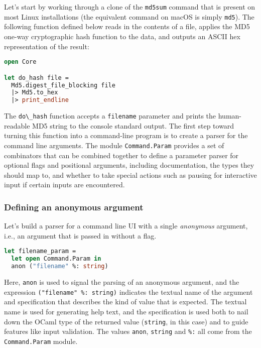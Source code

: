 Let's start by working through a clone of the
\passthrough{\lstinline!md5sum!} command that is present on most Linux
installations (the equivalent command on macOS is simply
\passthrough{\lstinline!md5!}). The following function defined below
reads in the contents of a file, applies the MD5 one-way cryptographic
hash function to the data, and outputs an ASCII hex representation of
the result: 

\begin{lstlisting}[language=Caml]
open Core

let do_hash file =
  Md5.digest_file_blocking file
  |> Md5.to_hex
  |> print_endline
\end{lstlisting}

The \passthrough{\lstinline!do\_hash!} function accepts a
\passthrough{\lstinline!filename!} parameter and prints the
human-readable MD5 string to the console standard output. The first step
toward turning this function into a command-line program is to create a
parser for the command line arguments. The module
\passthrough{\lstinline!Command.Param!} provides a set of combinators
that can be combined together to define a parameter parser for optional
flags and positional arguments, including documentation, the types they
should map to, and whether to take special actions such as pausing for
interactive input if certain inputs are encountered.

\hypertarget{anonymous-arguments}{%
\subsubsection{Defining an anonymous
argument}\label{anonymous-arguments}}

Let's build a parser for a command line UI with a single
\emph{anonymous} argument, i.e., an argument that is passed in without a
flag.

\begin{lstlisting}[language=Caml]
let filename_param =
  let open Command.Param in
  anon ("filename" %: string)
\end{lstlisting}

Here, \passthrough{\lstinline!anon!} is used to signal the parsing of an
anonymous argument, and the expression
\passthrough{\lstinline!("filename" \%: string)!} indicates the textual
name of the argument and specification that describes the kind of value
that is expected. The textual name is used for generating help text, and
the specification is used both to nail down the OCaml type of the
returned value (\passthrough{\lstinline!string!}, in this case) and to
guide features like input validation. The values
\passthrough{\lstinline!anon!}, \passthrough{\lstinline!string!} and
\passthrough{\lstinline!\%:!} all come from the
\passthrough{\lstinline!Command.Param!} module.

